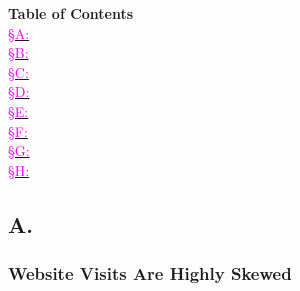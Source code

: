 \documentclass[12pt,twoside]{article}
\begin{document}
\textbf{\hphantom{aaaaa}Table of Contents}\\
\hyperref[sm:smA]{\indent \textcolor{magenta}{\S A:}} \smATitle{}\\
\hyperref[sm:smB]{\indent \textcolor{magenta}{\S B:}} \smBTitle{}\\
\hyperref[sm:smC]{\indent \textcolor{magenta}{\S C:}} \smCTitle{}\\
\hyperref[sm:smD]{\indent \textcolor{magenta}{\S D:}} \smDTitle{}\\
\hyperref[sm:smE]{\indent \textcolor{magenta}{\S E:}} \smETitle{}\\
\hyperref[sm:smF]{\indent \textcolor{magenta}{\S F:}} \smFTitle{}\\
\hyperref[sm:smG]{\indent \textcolor{magenta}{\S G:}} \smGTitle{}\\
\hyperref[sm:smH]{\indent \textcolor{magenta}{\S H:}} \smHTitle{}\\

\clearpage
\FloatBarrier
\renewcommand{\thetable}{A\arabic{table}}
\renewcommand{\thefigure}{A\arabic{figure}}
\renewcommand{\theequation}{A\arabic{equation}}
\subsection{A. \smATitle{}}\label{sm:smA}

\subsubsection{Website Visits Are Highly Skewed}
\end{document}
